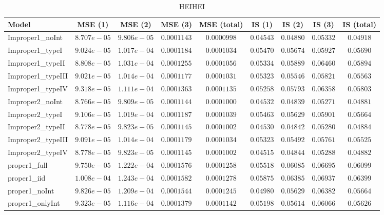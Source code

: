 \begin{table}

\caption{\label{tab:model-choice-sc7}HEIHEI}
\centering
\begin{tabular}{lcccccccc}
\hline
Model  & MSE (1) & MSE (2) & MSE (3) & MSE (total) & IS (1) & IS (2) & IS (3) & \multicolumn{1}{c}{IS (total)} \\ 
\hline
Improper1_noInt  & $8.707e-05$ & $9.806e-05$ & $0.0001143$ & $0.0000998$ & $0.04543$ & $0.04880$ & $0.05332$ & $0.04918$ \\
Improper1_typeI  & $9.024e-05$ & $1.017e-04$ & $0.0001184$ & $0.0001034$ & $0.05470$ & $0.05674$ & $0.05927$ & $0.05690$ \\
Improper1_typeII  & $8.808e-05$ & $1.031e-04$ & $0.0001255$ & $0.0001056$ & $0.05334$ & $0.05889$ & $0.06460$ & $0.05894$ \\
Improper1_typeIII  & $9.021e-05$ & $1.014e-04$ & $0.0001177$ & $0.0001031$ & $0.05323$ & $0.05546$ & $0.05821$ & $0.05563$ \\
Improper1_typeIV  & $9.318e-05$ & $1.111e-04$ & $0.0001363$ & $0.0001135$ & $0.05258$ & $0.05793$ & $0.06358$ & $0.05803$ \\
Improper2_noInt  & $8.766e-05$ & $9.809e-05$ & $0.0001144$ & $0.0001000$ & $0.04532$ & $0.04839$ & $0.05271$ & $0.04881$ \\
Improper2_typeI  & $9.106e-05$ & $1.019e-04$ & $0.0001187$ & $0.0001039$ & $0.05463$ & $0.05629$ & $0.05901$ & $0.05664$ \\
Improper2_typeII  & $8.778e-05$ & $9.823e-05$ & $0.0001145$ & $0.0001002$ & $0.04530$ & $0.04842$ & $0.05280$ & $0.04884$ \\
Improper2_typeIII  & $9.091e-05$ & $1.014e-04$ & $0.0001179$ & $0.0001034$ & $0.05323$ & $0.05492$ & $0.05761$ & $0.05525$ \\
Improper2_typeIV  & $8.778e-05$ & $9.823e-05$ & $0.0001145$ & $0.0001002$ & $0.04515$ & $0.04844$ & $0.05288$ & $0.04882$ \\
proper1_full  & $9.750e-05$ & $1.222e-04$ & $0.0001576$ & $0.0001258$ & $0.05518$ & $0.06085$ & $0.06695$ & $0.06099$ \\
proper1_iid  & $1.008e-04$ & $1.243e-04$ & $0.0001582$ & $0.0001278$ & $0.05875$ & $0.06385$ & $0.06937$ & $0.06399$ \\
proper1_noInt  & $9.826e-05$ & $1.209e-04$ & $0.0001544$ & $0.0001245$ & $0.04980$ & $0.05629$ & $0.06382$ & $0.05664$ \\
proper1_onlyInt  & $9.323e-05$ & $1.116e-04$ & $0.0001379$ & $0.0001142$ & $0.05198$ & $0.05614$ & $0.06066$ & $0.05626$ \\

\end{tabular}
\end{table}
